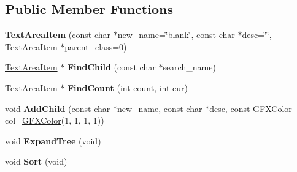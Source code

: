 \subsection*{Public Member Functions}
\begin{DoxyCompactItemize}
\item 
{\bfseries Text\+Area\+Item} (const char $\ast$new\+\_\+name=\char`\"{}blank\char`\"{}, const char $\ast$desc=\char`\"{}\char`\"{}, \hyperlink{classTextAreaItem}{Text\+Area\+Item} $\ast$parent\+\_\+class=0)\hypertarget{classTextAreaItem_aa69ab1f9f9458594938b2797bbd5b705}{}\label{classTextAreaItem_aa69ab1f9f9458594938b2797bbd5b705}

\item 
\hyperlink{classTextAreaItem}{Text\+Area\+Item} $\ast$ {\bfseries Find\+Child} (const char $\ast$search\+\_\+name)\hypertarget{classTextAreaItem_a7d7f3b45f4c724b3a27f6ac578a77c30}{}\label{classTextAreaItem_a7d7f3b45f4c724b3a27f6ac578a77c30}

\item 
\hyperlink{classTextAreaItem}{Text\+Area\+Item} $\ast$ {\bfseries Find\+Count} (int count, int cur)\hypertarget{classTextAreaItem_a53e57a912b6ef1407d12b36727d63742}{}\label{classTextAreaItem_a53e57a912b6ef1407d12b36727d63742}

\item 
void {\bfseries Add\+Child} (const char $\ast$new\+\_\+name, const char $\ast$desc, const \hyperlink{structGFXColor}{G\+F\+X\+Color} col=\hyperlink{structGFXColor}{G\+F\+X\+Color}(1, 1, 1, 1))\hypertarget{classTextAreaItem_a19ca547498b97ce3e095b6a48cfa70a6}{}\label{classTextAreaItem_a19ca547498b97ce3e095b6a48cfa70a6}

\item 
void {\bfseries Expand\+Tree} (void)\hypertarget{classTextAreaItem_aef4e1e718fe89f407928f7e2270feca0}{}\label{classTextAreaItem_aef4e1e718fe89f407928f7e2270feca0}

\item 
void {\bfseries Sort} (void)\hypertarget{classTextAreaItem_aacc076f83d77e656d0f372cb1f06e8cc}{}\label{classTextAreaItem_aacc076f83d77e656d0f372cb1f06e8cc}

\end{DoxyCompactItemize}
